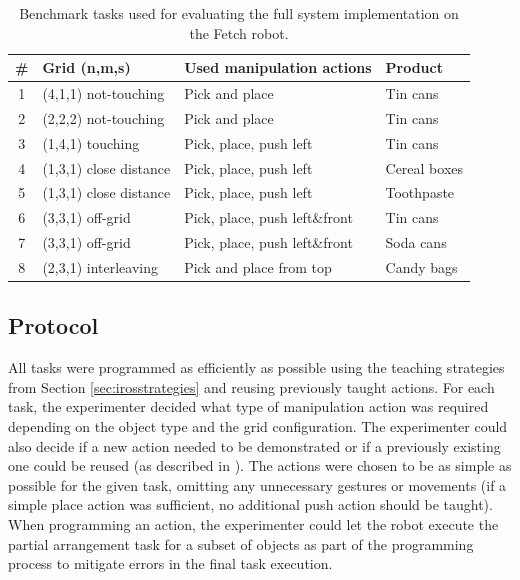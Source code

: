 \begin{table}[htp]
	\centering
	\caption{Benchmark tasks used for evaluating the full system implementation on the Fetch robot.}
	\label{table:tasklist}
	\begin{center}
		\begin{tabular}{clll}
			\# & Grid (n,m,s) & Used manipulation actions & Product \\ \hline
			1 & (4,1,1) not-touching & Pick and place & Tin cans \\
			2 & (2,2,2) not-touching & Pick and place & Tin cans \\
			3 & (1,4,1) touching & Pick, place, push left & Tin cans \\
			4 & (1,3,1) close distance & Pick, place, push left & Cereal boxes \\
			5 & (1,3,1) close distance & Pick, place, push left & Toothpaste \\
			6 & (3,3,1) off-grid & Pick, place, push left\&front & Tin cans \\
			7 & (3,3,1) off-grid & Pick, place, push left\&front& Soda cans \\
			8 & (2,3,1) interleaving & Pick and place from top & Candy bags \\ \hline
		\end{tabular}
	\end{center}
\end{table}
\subsection{Protocol}
All tasks were programmed as efficiently as possible using the teaching strategies from Section \ref{sec:irosstrategies} and reusing previously taught actions. 
For each task, the experimenter decided what type of manipulation action was required depending on the object type and the grid configuration.
The experimenter could also decide if a new action needed to be demonstrated or if a previously existing one could be reused (as described in ).
The actions were chosen to be as simple as possible for the given task, omitting any unnecessary gestures or movements (\eg if a simple place action was sufficient, no additional push action should be taught). When programming an action, the experimenter could let the robot execute the partial arrangement task for a subset of objects as part of the programming process to mitigate errors in the final task execution.



